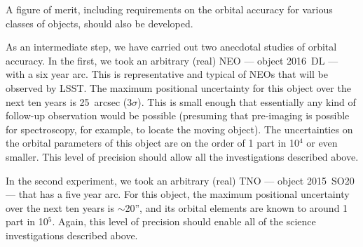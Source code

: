 A figure of merit, including requirements on the orbital accuracy for
various classes of objects, should also be developed.

As an intermediate step, we have carried out two anecdotal studies
of orbital accuracy. In the first,
we took an arbitrary (real) NEO --- object 2016~DL ---
with a six year arc. This is representative
and typical of NEOs that will be observed
by LSST.
The maximum positional uncertainty for this object
over the next ten years
is 25~arcsec (3$\sigma$). This is small enough
that essentially any kind of follow-up observation would be
possible (presuming that pre-imaging is possible
for spectroscopy, for example, to locate the moving
object).
The uncertainties on the orbital parameters
of this object are on the order of
1 part in 10$^4$ or even smaller. This level of
precision should allow all the investigations described
above.

In the second experiment, we took an arbitrary
(real) TNO --- object 2015~SO20 ---
that has a five year arc.
For this object, the maximum positional uncertainty
over the next ten years is $\sim$20'', and its orbital
elements are known to
around 1 part in 10$^5$. Again, this level
of precision should enable all of the science
investigations described above.


